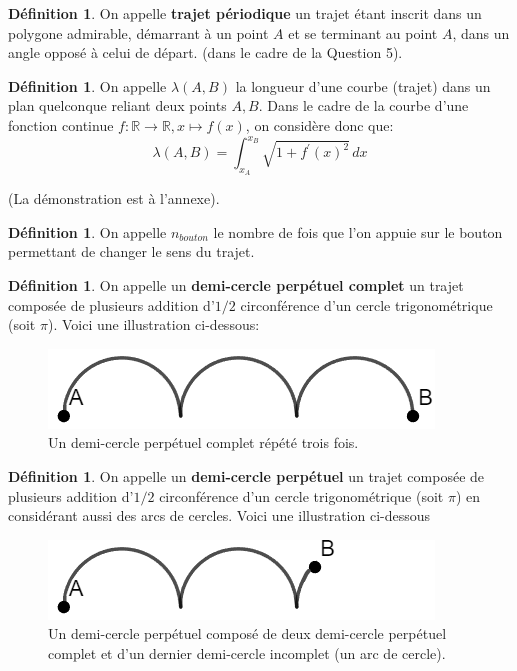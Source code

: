\documentclass[a4paper]{amsart}
\theoremstyle{definition}
\newtheorem{definition}[theorem]{Définition}
\theoremstyle{remark}
\numberwithin{equation}{section}
\begin{document}
\begin{definition}
  On appelle \textbf{trajet périodique} un trajet étant inscrit dans un polygone admirable, démarrant à un point $A$ et se terminant au point $A$, dans un angle opposé à celui de départ. (dans le cadre de la Question 5).
\end{definition}

\begin{definition}
  On appelle $\lambda(A,B)$ la longueur d'une courbe (trajet) dans un plan quelconque reliant deux points $A,B$. Dans le cadre de la courbe d'une fonction continue $f:\mathbb{R}\longrightarrow \mathbb{R}, x\longmapsto f(x)$,
  on considère donc que: \[\lambda(A,B)=\int_{x_A}^{x_B} \sqrt{1+{f^\prime}(x)^2} \,dx\]

  (La démonstration est à l'annexe).
\end{definition}

\begin{definition}
  On appelle $n_{bouton}$ le nombre de fois que l'on appuie sur le bouton permettant de changer le sens du trajet.
\end{definition}

\begin{definition}
  On appelle un \textbf{demi-cercle perpétuel complet} un trajet composée de plusieurs addition d'$1/2$ circonférence d'un cercle trigonométrique (soit $\pi$). Voici une illustration ci-dessous:

  \begin{figure}[H]
    \centering
    \includegraphics[scale=0.5]{images/demicircle.png}
    \caption{Un demi-cercle perpétuel complet répété trois fois.}
  \end{figure}
\end{definition}

\begin{definition}
  On appelle un \textbf{demi-cercle perpétuel} un trajet composée de plusieurs addition d'$1/2$ circonférence d'un cercle trigonométrique (soit $\pi$) en considérant aussi des arcs de cercles. Voici une illustration ci-dessous

  \begin{figure}[H]
    \centering
    \includegraphics[scale=0.5]{images/incomplete_demi_circle.png}
    \caption{Un demi-cercle perpétuel composé de deux demi-cercle perpétuel complet et d'un dernier demi-cercle incomplet (un arc de cercle).}
  \end{figure}
\end{definition}
\end{document}
